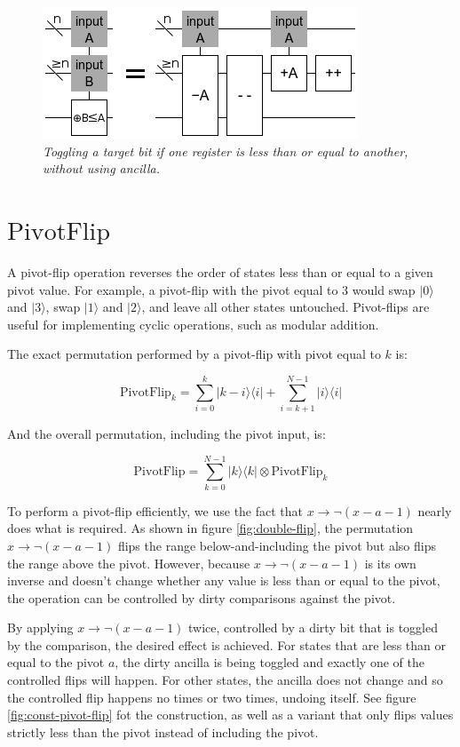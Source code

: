 \documentclass[twocolumn]{article}
\begin{document}
\begin{figure}
  \centering
  \includegraphics[totalheight=3cm]{comparison-leq.png}
  \caption{\em Toggling a target bit if one register is less than or equal to another, without using ancilla.}
  \label{fig:comparison-leq}
\end{figure}

\section{$\text{PivotFlip}$}

A pivot-flip operation reverses the order of states less than or equal to a given pivot value.
For example, a pivot-flip with the pivot equal to 3 would swap $|0\rangle$ and $|3\rangle$, swap $|1\rangle$ and $|2\rangle$, and leave all other states untouched.
Pivot-flips are useful for implementing cyclic operations, such as modular addition.

The exact permutation performed by a pivot-flip with pivot equal to $k$ is:

$$\text{PivotFlip}_k = \sum_{i=0}^k |k-i\rangle \langle i| + \sum_{i=k+1}^{N-1} |i\rangle \langle i|$$

And the overall permutation, including the pivot input, is:

$$\text{PivotFlip} = \sum_{k=0}^{N-1} |k\rangle \langle k| \otimes \text{PivotFlip}_{k}$$

To perform a pivot-flip efficiently, we use the fact that $x \rightarrow \lnot(x - a - 1)$ nearly does what is required.
As shown in figure \ref{fig:double-flip}, the permutation $x \rightarrow \lnot(x - a - 1)$ flips the range below-and-including the pivot but also flips the range above the pivot.
However, because $x \rightarrow \lnot(x - a - 1)$ is its own inverse and doesn't change whether any value is less than or equal to the pivot, the operation can be controlled by dirty comparisons against the pivot.

By applying $x \rightarrow \lnot(x - a - 1)$ twice, controlled by a dirty bit that is toggled by the comparison, the desired effect is achieved.
For states that are less than or equal to the pivot $a$, the dirty ancilla is being toggled and exactly one of the controlled flips will happen.
For other states, the ancilla does not change and so the controlled flip happens no times or two times, undoing itself.
See figure \ref{fig:const-pivot-flip} fot the construction, as well as a variant that only flips values strictly less than the pivot instead of including the pivot.
\end{document}
